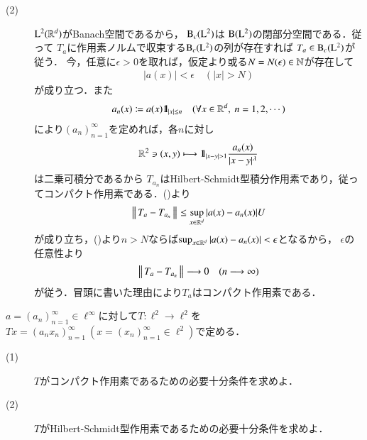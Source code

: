\begin{prf}
\begin{description}
			\item[(2)] $\mathrm{L}^2(\mathbb{R}^d)$がBanach空間であるから，
				$\mathrm{B}_c(\mathrm{L}^2) $は
				$\mathrm{B}(\mathrm{L}^2) $の閉部分空間である．従って
				$T_a$に作用素ノルムで収束する$\mathrm{B}_c(\mathrm{L}^2) $の列が存在すれば
				$T_a \in \mathrm{B}_c(\mathrm{L}^2) $が従う．
				今，任意に$\epsilon > 0$を取れば，仮定より或る$N = N(\epsilon) \in \mathbb{N}$が存在して
				\begin{align}
					|a(x)| < \epsilon \quad (|x| > N)
					\label{eq:report_6_2}
				\end{align}
				が成り立つ．また
				\begin{align}
					a_n(x) \coloneqq a(x)\mbox{1}\hspace{-0.25em}\mbox{l}_{|x| \leq n}
					\quad (\forall x \in \mathbb{R}^d,\ n=1,2,\cdots)
				\end{align}
				により$(a_n)_{n=1}^{\infty}$を定めれば，各$n$に対し
				\begin{align}
					\mathbb{R}^2 \ni (x,y) \longmapsto \mbox{1}\hspace{-0.25em}\mbox{l}_{|x - y| > 1} \frac{a_n(x)}{|x-y|^\lambda}
				\end{align}
				は二乗可積分であるから
				$T_{a_n}$はHilbert-Schmidt型積分作用素であり，従ってコンパクト作用素である．()より
				\begin{align}
					\left\|\, T_a - T_{a_n}\, \right\|_{} \leq \operatorname*{sup}_{x \in \mathbb{R}^d} |a(x) - a_n(x)| U
				\end{align}
				が成り立ち，()より$n > N$ならば$\operatorname*{sup}_{x \in \mathbb{R}^d} |a(x) - a_n(x)| < \epsilon$となるから，
				$\epsilon$の任意性より
				\begin{align}
					\left\|\, T_a - T_{a_n}\, \right\|_{} \longrightarrow 0 \quad (n \longrightarrow \infty)
				\end{align}
				が従う．冒頭に書いた理由により$T_a$はコンパクト作用素である．
				\QED
		\end{description}
	\end{prf}
	
	\begin{screen}
		[7] $a = (a_n)_{n=1}^{\infty} \in \ell^{\infty}$に対して$T:\ell^2 \rightarrow \ell^2$を
		$Tx = (a_n x_n)_{n=1}^{\infty}\ (x = (x_n)_{n=1}^{\infty} \in \ell^2)$で定める．
		\begin{description}
			\item[(1)] $T$がコンパクト作用素であるための必要十分条件を求めよ．
			\item[(2)] $T$がHilbert-Schmidt型作用素であるための必要十分条件を求めよ．
		\end{description}
	\end{screen}
	
